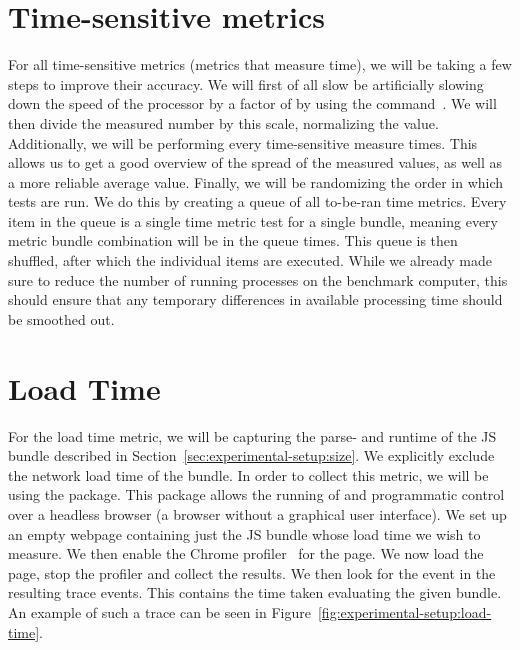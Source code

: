 \section{Time-sensitive metrics}\label{sec:experimental-setup:time-sensitive-metrics}
For all time-sensitive metrics (metrics that measure time), we will be taking a few steps to improve their accuracy. We will first of all slow be artificially slowing down the speed of the processor by a factor of \slowdownFactor{} by using the  command~. We will then divide the measured number by this scale, normalizing the value. Additionally, we will be performing every time-sensitive measure \numMeasures{} times. This allows us to get a good overview of the spread of the measured values, as well as a more reliable average value. Finally, we will be randomizing the order in which tests are run. We do this by creating a queue of all to-be-ran time metrics. Every item in the queue is a single time metric test for a single bundle, meaning every metric bundle combination will be in the queue \numMeasures{} times. This queue is then shuffled, after which the individual items are executed. While we already made sure to reduce the number of running processes on the benchmark computer, this should ensure that any temporary differences in available processing time should be smoothed out.

\section{Load Time}\label{sec:experimental-setup:load-time}
For the load time metric, we will be capturing the parse- and runtime of the JS bundle described in Section~\ref{sec:experimental-setup:size}. We explicitly exclude the network load time of the bundle. In order to collect this metric, we will be using the  package. This package allows the running of and programmatic control over a headless browser (a browser without a graphical user interface). We set up an empty webpage containing just the JS bundle whose load time we wish to measure. We then enable the Chrome profiler~ for the page. We now load the page, stop the profiler and collect the results. We then look for the  event in the resulting trace events. This contains the time taken evaluating the given bundle. An example of such a trace can be seen in Figure~\ref{fig:experimental-setup:load-time}.

